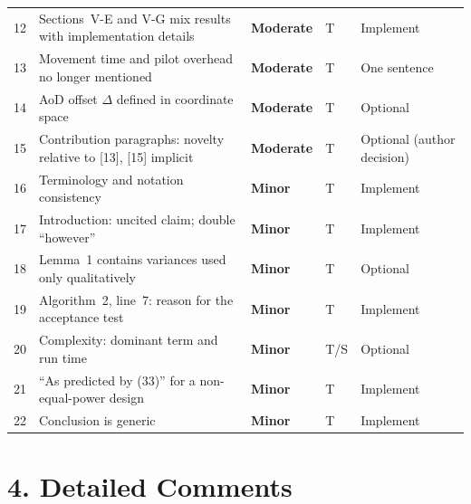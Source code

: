 \documentclass[10.5pt,a4paper]{article}
\newcommand{\Moderate}{\textcolor{BurntOrange}{\textbf{Moderate}}}
\newcommand{\Minor}{\textcolor{OliveGreen}{\textbf{Minor}}}
\begin{document}
\begin{center}
\begin{longtable}{>{\raggedright}p{0.5cm}>{\raggedright}p{7.2cm}>{\raggedright}p{1.55cm}>{\raggedright}p{0.9cm}>{\raggedright\arraybackslash}p{3.9cm}}
12 & Sections~V-E and V-G mix results with implementation details & \Moderate & T & Implement \\
13 & Movement time and pilot overhead no longer mentioned & \Moderate & T & One sentence \\
14 & AoD offset $\Delta$ defined in coordinate space & \Moderate & T & Optional \\
15 & Contribution paragraphs: novelty relative to [13], [15] implicit & \Moderate & T & Optional (author decision) \\
16 & Terminology and notation consistency & \Minor & T & Implement \\
17 & Introduction: uncited claim; double ``however'' & \Minor & T & Implement \\
18 & Lemma~1 contains variances used only qualitatively & \Minor & T & Optional \\
19 & Algorithm~2, line~7: reason for the acceptance test & \Minor & T & Implement \\
20 & Complexity: dominant term and run time & \Minor & T/S & Optional \\
21 & ``As predicted by (33)'' for a non-equal-power design & \Minor & T & Implement \\
22 & Conclusion is generic & \Minor & T & Implement \\
\bottomrule
\end{longtable}
\end{center}

\section*{4. Detailed Comments}
\end{document}
